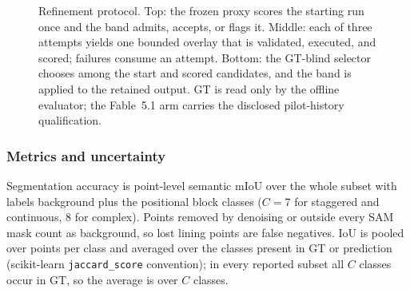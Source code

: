 \documentclass[a4paper,fleqn]{cas-dc}
\begin{document}
\begin{figure}[t]
{}
\caption{Refinement protocol. Top: the frozen proxy scores the starting run once and the band admits, accepts, or flags it. Middle: each of three attempts yields one bounded overlay that is validated, executed, and scored; failures consume an attempt. Bottom: the GT-blind selector chooses among the start and scored candidates, and the band is applied to the retained output. GT is read only by the offline evaluator; the Fable~5.1 arm carries the disclosed pilot-history qualification.}
\label{fig:verification}
\end{figure}

\subsubsection{Metrics and uncertainty}
\label{sec:metrics}

Segmentation accuracy is point-level semantic mIoU over the whole subset with labels background plus the positional block classes ($C=7$ for staggered and continuous, $8$ for complex). Points removed by denoising or outside every SAM mask count as background, so lost lining points are false negatives. IoU is pooled over points per class and averaged over the classes present in GT or prediction (scikit-learn \texttt{jaccard\_score} convention); in every reported subset all $C$ classes occur in GT, so the average is over $C$ classes.
\end{document}
